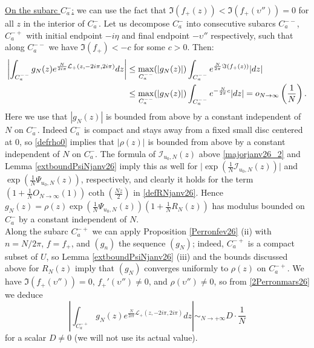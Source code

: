 \documentclass[11pt]{amsart}
\newcommand{\ra}{\rightarrow}
\begin{document}
{\underline{On the subarc $C_a^-$:} we can use the fact that $\Im(f_+(z))< \Im(f_+(\upsilon''))=0$ for all $z$ in the interior of $C_a^-$. Let us decompose $C_a^-$ into consecutive subarcs $C_a^{--}$, $C_a^{-+}$ with initial endpoint $-i\eta$ and final endpoint $-\upsilon''$ respectively, such that along $C_a^{--}$ we have $\Im(f_+)<-c$ for some $c>0$. Then:
\begin{align}
	\left \vert \int_{C_a^{--}} g_N(z) e^{\frac{N}{2i\pi}\mathcal{L}_+(z,-2i\pi,2i\pi)}dz\right \vert 
	&\leq \max_{C_a^{--}}(|g_N(z)|)
	\int_{C_a^{--}} e^{\frac{N}{2\pi}\Im(f_+(z))}\vert dz\vert \notag\\
	&\leq  \max_{C_a^{--}}(|g_N(z)|)\int_{C_a^{--}} e^{-\frac{N}{2\pi}c}\vert dz\vert = o_{N\to\infty}\left (\frac{1}{{N}}\right ).\label{intCa-Ofev26}
\end{align}
Here we use that $\textstyle |g_N(z)|$ is bounded from above by a constant independent of $N$ on $C_a^-$. Indeed $C_{a}^-$ is compact and stays away from a fixed small disc centered at $0$, so \eqref{defrho0} implies that $\vert \rho(z)\vert$ is bounded from above by a constant independent of $N$ on $C_{a}^-$. The formula of ${\mathcal{I}_{u_0,N}(z)}$ above \eqref{majorjanv26_2} and Lemma \ref{extboundPsiNjanv26} imply this as well for $\textstyle \vert \exp\left(\frac{1}{N}{\mathcal{I}_{u_0,N}(z)}\right)\vert$ and $\textstyle \exp\left(\frac{1}{N}{\Psi_{u_0,N}(z)}\right)$, respectively, and clearly it holds for the term $\textstyle \left(1+\frac{1}{N}O_{N\ra \infty}\left(1\right)\right)\coth\left(\frac{Nz}{2}\right)$ in \eqref{defRNjanv26}. Hence $\textstyle g_N(z) = \rho(z)\exp\left(\frac{1}{N}{\Psi_{u_0,N}(z)}\right)\textstyle (1 + \frac{1}{N}R_N(z))$ has modulus bounded on $C_{a}^-$ by a constant independent of $N$.\\
Along the subarc $C_a^{-+}$ we can apply Proposition \ref{Perronfev26} (ii) with $n=N/2\pi$, $f=f_+$, and $(g_n)$ the sequence $(g_N)$; indeed, $C_a^{-+}$ is a compact subset of $U$, so Lemma \ref{extboundPsiNjanv26} (iii) and the bounds discussed above for $R_N(z)$ imply that $(g_N)$ converges uniformly to $\rho(z)$ on $C_a^{-+}$. We have $\Im(f_+(\upsilon''))=0$,  $f_+'(\upsilon'')\ne 0$, and $\rho(\upsilon'') \ne 0$, so from \eqref{2Perronmars26} we deduce 
$$\left \vert \int_{C_a^{-+}} g_N(z) e^{\frac{N}{2i\pi}\mathcal{L}_+(z,-2i\pi,2i\pi)}dz \right \vert \sim_{N\to +\infty} D\cdot \frac{1}{N}$$
for a scalar $D\ne 0$ (we will not use its actual value). 

\smallskip

}
\end{document}
